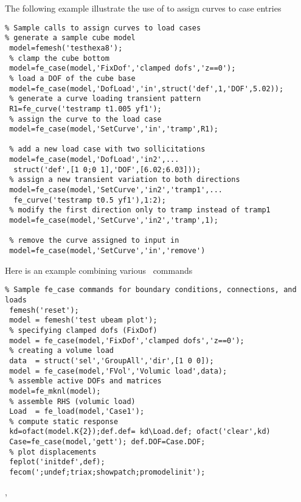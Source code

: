 \vs

The following example illustrate the use of  to assign curves to case entries

\begin{verbatim}
% Sample calls to assign curves to load cases
% generate a sample cube model
 model=femesh('testhexa8'); 
 % clamp the cube bottom
 model=fe_case(model,'FixDof','clamped dofs','z==0');
 % load a DOF of the cube base
 model=fe_case(model,'DofLoad','in',struct('def',1,'DOF',5.02));
 % generate a curve loading transient pattern
 R1=fe_curve('testramp t1.005 yf1');
 % assign the curve to the load case
 model=fe_case(model,'SetCurve','in','tramp',R1);
 
 % add a new load case with two sollicitations
 model=fe_case(model,'DofLoad','in2',...
  struct('def',[1 0;0 1],'DOF',[6.02;6.03]));
 % assign a new transient variation to both directions
 model=fe_case(model,'SetCurve','in2','tramp1',...
  fe_curve('testramp t0.5 yf1'),1:2);
 % modify the first direction only to tramp instead of tramp1
 model=fe_case(model,'SetCurve','in2','tramp',1);
 
 % remove the curve assigned to input in
 model=fe_case(model,'SetCurve','in','remove')
\end{verbatim}%



Here is an example combining various \fecase\ commands

\begin{verbatim}
% Sample fe_case commands for boundary conditions, connections, and loads
 femesh('reset');
 model = femesh('test ubeam plot');
 % specifying clamped dofs (FixDof) 
 model = fe_case(model,'FixDof','clamped dofs','z==0');
 % creating a volume load
 data  = struct('sel','GroupAll','dir',[1 0 0]);
 model = fe_case(model,'FVol','Volumic load',data);
 % assemble active DOFs and matrices
 model=fe_mknl(model);
 % assemble RHS (volumic load)
 Load  = fe_load(model,'Case1');
 % compute static response
 kd=ofact(model.K{2});def.def= kd\Load.def; ofact('clear',kd)
 Case=fe_case(model,'gett'); def.DOF=Case.DOF;
 % plot displacements
 feplot('initdef',def);
 fecom(';undef;triax;showpatch;promodelinit');
\end{verbatim}%


\noindent \femk, \fecase







